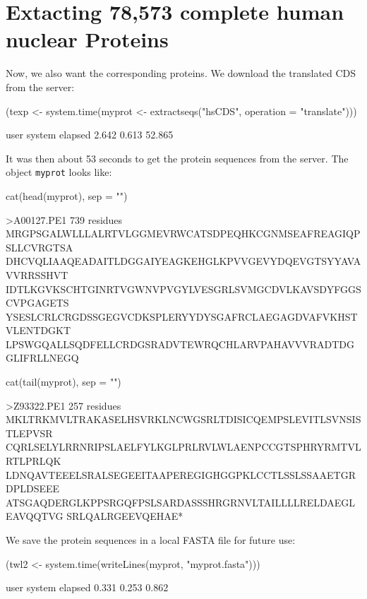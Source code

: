 \documentclass{article}
\begin{document}
\section{Extacting 78,573 complete human nuclear Proteins}

Now, we also want the corresponding proteins. We download the translated 
CDS from the server:

\begin{Schunk}
\begin{Sinput}
 (texp <- system.time(myprot <- extractseqs("hsCDS", operation = "translate")))
\end{Sinput}
\begin{Soutput}
   user  system elapsed 
  2.642   0.613  52.865 
\end{Soutput}
\end{Schunk}

It was then about 53 seconds
to get the protein sequences from the server. The object \texttt{myprot} looks
like:

\begin{Schunk}
\begin{Sinput}
 cat(head(myprot), sep = "\n")
\end{Sinput}
\begin{Soutput}
>A00127.PE1              739 residues
MRGPSGALWLLLALRTVLGGMEVRWCATSDPEQHKCGNMSEAFREAGIQPSLLCVRGTSA
DHCVQLIAAQEADAITLDGGAIYEAGKEHGLKPVVGEVYDQEVGTSYYAVAVVRRSSHVT
IDTLKGVKSCHTGINRTVGWNVPVGYLVESGRLSVMGCDVLKAVSDYFGGSCVPGAGETS
YSESLCRLCRGDSSGEGVCDKSPLERYYDYSGAFRCLAEGAGDVAFVKHSTVLENTDGKT
LPSWGQALLSQDFELLCRDGSRADVTEWRQCHLARVPAHAVVVRADTDGGLIFRLLNEGQ
\end{Soutput}
\begin{Sinput}
 cat(tail(myprot), sep = "\n")
\end{Sinput}
\begin{Soutput}
>Z93322.PE1              257 residues
MKLTRKMVLTRAKASELHSVRKLNCWGSRLTDISICQEMPSLEVITLSVNSISTLEPVSR
CQRLSELYLRRNRIPSLAELFYLKGLPRLRVLWLAENPCCGTSPHRYRMTVLRTLPRLQK
LDNQAVTEEELSRALSEGEEITAAPEREGIGHGGPKLCCTLSSLSSAAETGRDPLDSEEE
ATSGAQDERGLKPPSRGQFPSLSARDASSSHRGRNVLTAILLLLRELDAEGLEAVQQTVG
SRLQALRGEEVQEHAE*
\end{Soutput}
\end{Schunk}

We save the protein sequences in a local FASTA file for future use:

\begin{Schunk}
\begin{Sinput}
 (twl2 <- system.time(writeLines(myprot, "myprot.fasta")))
\end{Sinput}
\begin{Soutput}
   user  system elapsed 
  0.331   0.253   0.862 
\end{Soutput}
\end{Schunk}
\end{document}
